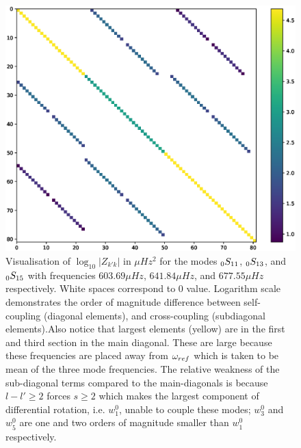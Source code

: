 \begin{figure}[h]
\includegraphics[scale=0.6,center]{Chapter2/figs/coup_mat}
\caption{Visualisation of $\log_{10}|Z_{k'k}|$ in $\mu Hz^2$ for the modes $_{0}S_{11}$, $_{0}S_{13}$, and $_{0}S_{15}$ with frequencies $603.69 \mu Hz$, $641.84\mu Hz$, and $677.55 \mu Hz$ respectively. White spaces correspond to $0$ value. Logarithm scale demonstrates the order of magnitude difference between self-coupling (diagonal elements), and cross-coupling (subdiagonal elements).Also notice that largest elements (yellow) are in the first and third section in the main diagonal. These are large because these frequencies are placed away from $\omega_{ref}$ which is taken to be mean of the three mode frequencies. The relative weakness of the sub-diagonal terms compared to the main-diagonals is because $l-l'\geq 2$ forces $s\geq 2$ which makes the largest component of differential rotation, i.e. $w_1^0$, unable to couple these modes; $w_3^0$ and $w_5^0$ are one and two orders of magnitude smaller than $w_1^0$ respectively.}  
\label{fig:coup_mat}
\end{figure}